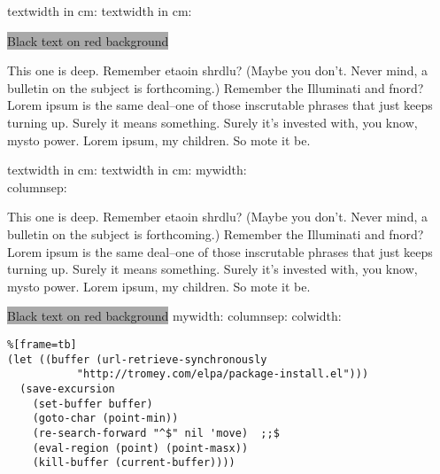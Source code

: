 \documentclass[]{article}
\begin{document}
textwidth in cm: \prntlen{\textwidth}
textwidth in cm: \prntlen{\linewidth}

\colorbox{darkgray}{Black text on red background}

\noindent\colorbox{darkgray}{}

\begin{multicols}{2}


This one is deep. Remember etaoin shrdlu? (Maybe you don't. Never mind, a bulletin on the subject is forthcoming.) Remember the Illuminati and fnord? Lorem ipsum is the same deal--one of those inscrutable phrases that just keeps turning up. Surely it means something. Surely it's invested with, you know, mysto power. Lorem ipsum, my children. So mote it be.

textwidth in cm: \prntlen{\textwidth}
textwidth in cm: \prntlen{\linewidth}
\newlength{\mywidth}
\setlength{\mywidth}{\linewidth}
\addtolength{\mywidth}{-0.5\columnsep}
\newlength{\mytikzwidth}
\setlength{\mytikzwidth}{\linewidth}
\addtolength{\mytikzwidth}{-4ex}
mywidth: \the\mywidth\\ columnsep: \the\columnsep\\
\noindent\colorbox{lightgray}{}

This one is deep. Remember etaoin shrdlu? (Maybe you don't. Never mind, a bulletin on the subject is forthcoming.) Remember the Illuminati and fnord? Lorem ipsum is the same deal--one of those inscrutable phrases that just keeps turning up. Surely it means something. Surely it's invested with, you know, mysto power. Lorem ipsum, my children. So mote it be.


\noindent\colorbox{darkgray}{Black text on red background}
mywidth: \the\mywidth columnsep: \the\columnsep colwidth: \the\columnwidth \\

\noindent\colorbox{lightgray}{}

\noindent{}

\lstset{columns=fullflexible, basicstyle=\ttfamily,  basicstyle=\tiny, numbers=left, numberstyle=\tiny, stepnumber=2, numbersep=15pt}
\begin{lstlisting}%[frame=tb]
(let ((buffer (url-retrieve-synchronously
           "http://tromey.com/elpa/package-install.el")))
  (save-excursion
    (set-buffer buffer)
    (goto-char (point-min))
    (re-search-forward "^$" nil 'move)  ;;$
    (eval-region (point) (point-masx))
    (kill-buffer (current-buffer))))
\end{lstlisting}

\end{multicols}
\end{document}
